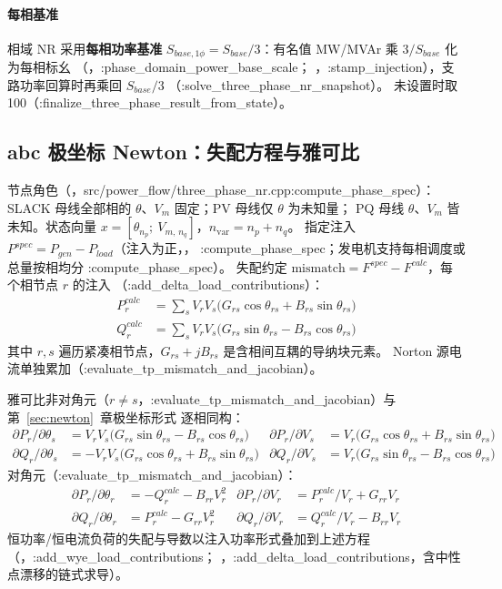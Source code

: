 \paragraph{每相基准} 相域 NR 采用\textbf{每相功率基准}
$S_{base,1\phi}=S_{base}/3$：有名值 MW/MVAr 乘 $3/S_{base}$ 化为每相标幺
（，:phase\_domain\_power\_base\_scale；
，:stamp\_injection），支路功率回算时再乘回 $S_{base}/3$
（:solve\_three\_phase\_nr\_snapshot）。 未设置时取 100（:finalize\_three\_phase\_result\_from\_state）。

\subsection{abc 极坐标 Newton：失配方程与雅可比}

节点角色（，src/power\_flow/three\_phase\_nr.cpp:compute\_phase\_spec）：
SLACK 母线全部相的 $\theta$、$V_m$ 固定；PV 母线仅 $\theta$ 为未知量；
PQ 母线 $\theta$、$V_m$ 皆未知。状态向量
$x=[\theta_{n_p};\ V_{m,\,n_q}]$，$n_{\mathrm{var}}=n_p+n_q$。
指定注入 $P^{spec}=P_{gen}-P_{load}$（注入为正，，
:compute\_phase\_spec；发电机支持每相调度或总量按相均分 :compute\_phase\_spec）。
失配约定 $\mathrm{mismatch}=F^{spec}-F^{calc}$，每个相节点 $r$ 的注入
（:add\_delta\_load\_contributions）：
\begin{align*}
P_r^{calc}&=\sum_{s}V_rV_s\big(G_{rs}\cos\theta_{rs}+B_{rs}\sin\theta_{rs}\big)\\
Q_r^{calc}&=\sum_{s}V_rV_s\big(G_{rs}\sin\theta_{rs}-B_{rs}\cos\theta_{rs}\big)
\end{align*}
其中 $r,s$ 遍历紧凑相节点，$G_{rs}+jB_{rs}$ 是含相间互耦的导纳块元素。
Norton 源电流单独累加（:evaluate\_tp\_mismatch\_and\_jacobian）。

雅可比非对角元（$r\neq s$，:evaluate\_tp\_mismatch\_and\_jacobian）与第~\ref{sec:newton}~章极坐标形式
逐相同构：
\begin{align*}
\partial P_r/\partial\theta_s&=V_rV_s\big(G_{rs}\sin\theta_{rs}-B_{rs}\cos\theta_{rs}\big) &
\partial P_r/\partial V_s&=V_r\big(G_{rs}\cos\theta_{rs}+B_{rs}\sin\theta_{rs}\big)\\
\partial Q_r/\partial\theta_s&=-V_rV_s\big(G_{rs}\cos\theta_{rs}+B_{rs}\sin\theta_{rs}\big) &
\partial Q_r/\partial V_s&=V_r\big(G_{rs}\sin\theta_{rs}-B_{rs}\cos\theta_{rs}\big)
\end{align*}
对角元（:evaluate\_tp\_mismatch\_and\_jacobian）：
\begin{align*}
\partial P_r/\partial\theta_r&=-Q_r^{calc}-B_{rr}V_r^2 &
\partial P_r/\partial V_r&=P_r^{calc}/V_r+G_{rr}V_r\\
\partial Q_r/\partial\theta_r&=P_r^{calc}-G_{rr}V_r^2 &
\partial Q_r/\partial V_r&=Q_r^{calc}/V_r-B_{rr}V_r
\end{align*}
恒功率/恒电流负荷的失配与导数以注入功率形式叠加到上述方程
（，:add\_wye\_load\_contributions；
，:add\_delta\_load\_contributions，含中性点漂移的链式求导）。

